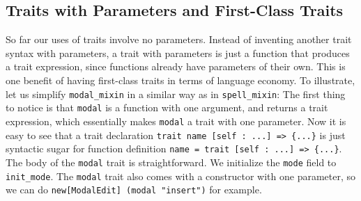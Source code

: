 


\begin{comment}
\paragraph{Mutually dependent traits} When two traits are composed, any two
methods in those two traits can refer to each other via the self-reference. We
say these two traits are \emph{mutually dependent}. The next example, though a
bit contrived, illustrates this point.

\noindent By utilizing trait requirements, the \lstinline{isEven} and
\lstinline{isOdd} methods can refer to each other in two different traits.
\end{comment}


\subsection{Traits with Parameters and First-Class Traits}\label{subsec:cons}

So far our uses of traits involve no parameters. Instead of inventing another trait
syntax with parameters, a trait with parameters is just a function that produces
a trait expression, since functions already have parameters of their own. This
is one benefit of having first-class traits in terms of language economy. To
illustrate, let us simplify \lstinline{modal_mixin} in a similar way as in \lstinline{spell_mixin}:
The first thing to notice is that \lstinline{modal} is a function with one
argument, and returns a trait expression, which essentially makes
\lstinline{modal} a trait with one parameter.
Now it is easy to see that a trait declaration
\lstinline$trait name [self : ...] => {...}$ is just syntactic sugar for
function definition \lstinline$name = trait [self : ...] => {...}$. The body of
the \lstinline{modal} trait is straightforward. We initialize the
\lstinline{mode} field to \lstinline{init_mode}.
The \lstinline{modal} trait also comes with a constructor with one parameter,
so we can do \lstinline{new[ModalEdit] (modal "insert")} for example.

